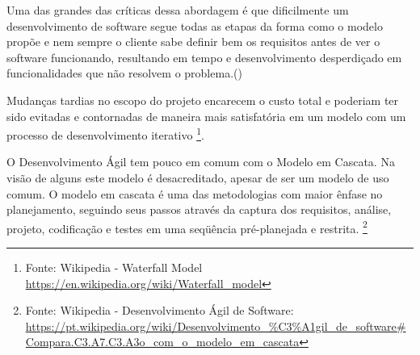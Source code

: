 \par Uma das grandes das críticas dessa abordagem é que dificilmente um desenvolvimento de software segue todas as etapas da forma como o modelo propõe  e nem sempre o cliente sabe definir bem os requisitos antes de ver o software funcionando, resultando em tempo e desenvolvimento desperdiçado em funcionalidades que não resolvem o problema.(\cite{pressman:11}) 
\par Mudanças tardias no escopo do projeto encarecem o custo total e poderiam ter sido evitadas e contornadas de maneira mais satisfatória em um modelo com um processo de desenvolvimento iterativo \footnote{ Fonte: Wikipedia - Waterfall Model \url {https://en.wikipedia.org/wiki/Waterfall_model}}. 
\par O Desenvolvimento Ágil tem pouco em comum com o Modelo em Cascata. Na visão de alguns este modelo é desacreditado, apesar de ser um modelo de uso comum. O modelo em cascata é uma das metodologias com maior ênfase no planejamento, seguindo seus passos através da captura dos requisitos, análise, projeto, codificação e testes em uma seqüência pré-planejada e restrita. \footnote {Fonte: Wikipedia - Desenvolvimento Ágil de Software: \url{https://pt.wikipedia.org/wiki/Desenvolvimento_\%C3\%A1gil_de_software#Compara.C3.A7.C3.A3o_com_o_modelo_em_cascata}}